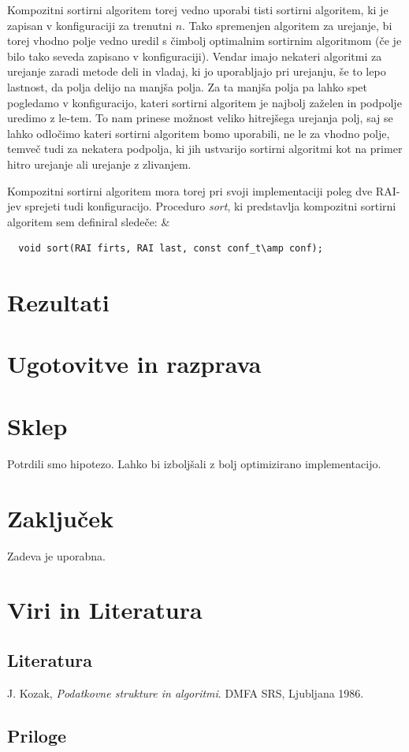 \documentclass[a4paper,oneside]{article}
\def\&:{\,::=&\,}
\begin{document}
Kompozitni sortirni algoritem torej vedno uporabi tisti sortirni algoritem, ki je zapisan
v konfiguraciji za trenutni $n$. Tako spremenjen algoritem za urejanje, bi torej vhodno
polje vedno uredil s čimbolj optimalnim sortirnim algoritmom (če je bilo tako seveda
zapisano v konfiguraciji). Vendar imajo nekateri algoritmi za urejanje zaradi metode deli in vladaj,
ki jo uporabljajo pri urejanju, še to lepo lastnost, da polja delijo na manjša polja. Za
ta manjša polja pa lahko spet pogledamo v konfiguracijo, kateri sortirni algoritem je
najbolj zaželen in podpolje uredimo z le-tem. To nam prinese možnost veliko hitrejšega
urejanja polj, saj se lahko odločimo kateri sortirni algoritem bomo
uporabili, ne le za vhodno polje, temveč tudi za nekatera podpolja, ki jih ustvarijo
sortirni algoritmi kot na primer hitro urejanje ali urejanje z zlivanjem.

Kompozitni sortirni algoritem mora torej pri svoji implementaciji poleg dve RAI-jev
sprejeti tudi konfiguracijo. Proceduro \emph{sort}, ki predstavlja kompozitni sortirni
algoritem sem definiral sledeče: \&
\begin{lstlisting}
  void sort(RAI firts, RAI last, const conf_t\amp conf);
\end{lstlisting}

%


\section{Rezultati}
\section{Ugotovitve in razprava}
\section{Sklep}
Potrdili smo hipotezo. Lahko bi izboljšali z bolj optimizirano implementacijo.
\section{Zaključek}
Zadeva je uporabna.
\section{Viri in Literatura}
\subsection{Literatura}
\vspace{-1cm}
\begin{thebibliography}{99}
   {J. Kozak, \emph{Podatkovne strukture in algoritmi}. DMFA SRS, Ljubljana 1986. }
\end{thebibliography}
\subsection{Priloge}
\end{document}
